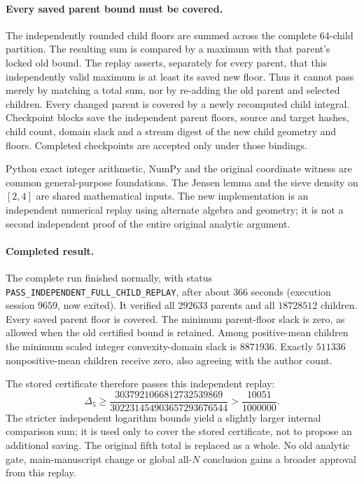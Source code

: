 \paragraph{Every saved parent bound must be covered.}
The independently rounded child floors are summed across the complete
$64$-child partition. The resulting sum is compared by a maximum with
that parent's locked old bound. The replay asserts, separately for
every parent, that this independently valid maximum is at least its
saved new floor. Thus it cannot pass merely by matching a total sum,
nor by re-adding the old parent and selected children. Every changed
parent is covered by a newly recomputed child integral.
Checkpoint blocks save the independent parent floors, source and
target hashes, child count, domain slack and a stream digest of the
new child geometry and floors. Completed checkpoints are accepted
only under those bindings.

Python exact integer arithmetic, NumPy and the original coordinate
witness are common general-purpose foundations. The Jensen lemma and
the sieve density on $[2,4]$ are shared mathematical inputs. The new
implementation is an independent numerical replay using alternate
algebra and geometry; it is not a second independent proof of the
entire original analytic argument.

\paragraph{Completed result.}
The complete run finished normally, with status
\texttt{PASS\_INDEPENDENT\_FULL\_CHILD\_REPLAY}, after about $366$
seconds (execution session $9659$, now exited). It verified all
$292633$ parents and all $18728512$ children. Every saved parent
floor is covered. The minimum parent-floor slack is zero, as allowed
when the old certified bound is retained. Among positive-mean children
the minimum scaled integer convexity-domain slack is $8871936$.
Exactly $511336$ nonpositive-mean children receive zero, also agreeing
with the author count.

The stored certificate therefore passes this independent replay:
\[
 \Delta_5\ge
 \frac{3037921066812732539869}{302231454903657293676544}
 >\frac{10051}{1000000}.
\]
The stricter independent logarithm bounds yield a slightly larger
internal comparison sum; it is used only to cover the stored certificate,
not to propose an additional saving. The original fifth total is
replaced as a whole. No old analytic gate, main-manuscript change or
global all-$N$ conclusion gains a broader approval from this replay.
